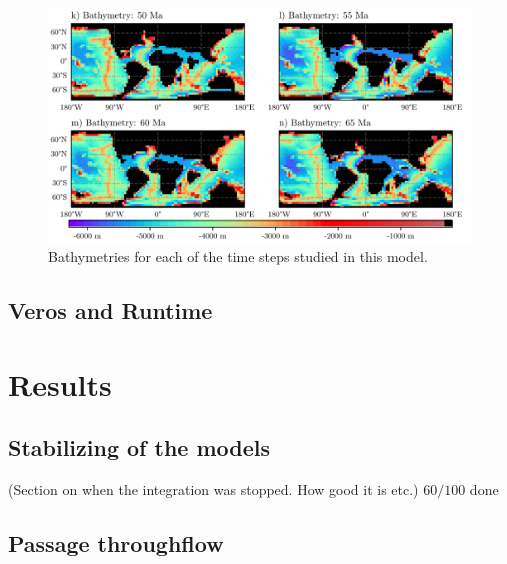 \documentclass[a4paper]{article}
\begin{document}
\begin{figure}[H]
	\includegraphics[width=\linewidth]{bathymetries_2_crop.pdf}
	\caption{Bathymetries for each of the time steps studied in this model.}
	\label{fig:bathys}
\end{figure}

\begin{multicols}{2}




\subsection{Veros and Runtime}


\section{Results}
\subsection{Stabilizing of the models}
(Section on when the integration was stopped. How good it is etc.)
$60/100$ done


\subsection{Passage throughflow}

\end{multicols}
\end{document}
